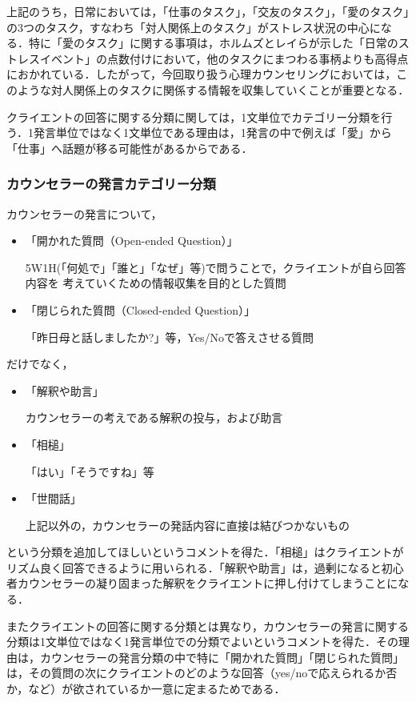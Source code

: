\documentclass[shuuron]{kuee}
\begin{document}
上記のうち，日常においては，「仕事のタスク」，「交友のタスク」，「愛のタスク」の3つのタスク，すなわち「対人関係上のタスク」がストレス状況の中心になる．特に「愛のタスク」に関する事項は，ホルムズとレイら\cite{holmes1967social}が示した「日常のストレスイベント」の点数付けにおいて，他のタスクにまつわる事柄よりも高得点におかれている．したがって，今回取り扱う心理カウンセリングにおいては，このような対人関係上のタスクに関係する情報を収集していくことが重要となる．

クライエントの回答に関する分類に関しては，1文単位でカテゴリー分類を行う．1発言単位ではなく1文単位である理由は，1発言の中で例えば「愛」から「仕事」へ話題が移る可能性があるからである．

\subsubsection{カウンセラーの発言カテゴリー分類}

カウンセラーの発言について，
\begin{itemize}
  \item 「開かれた質問（Open-ended Question）」

  5W1H(「何処で」「誰と」「なぜ」等)で問うことで，クライエントが自ら回答内容を
  考えていくための情報収集を目的とした質問
  \item 「閉じられた質問（Closed-ended Question）」

  「昨日母と話しましたか?」等，Yes/Noで答えさせる質問
\end{itemize}
だけでなく，
\begin{itemize}
  \item 「解釈や助言」

  カウンセラーの考えである解釈の投与，および助言
  \item 「相槌」

  「はい」「そうですね」等
  \item 「世間話」

  上記以外の，カウンセラーの発話内容に直接は結びつかないもの
\end{itemize}
という分類を追加してほしいというコメントを得た．「相槌」はクライエントがリズム良く回答できるように用いられる．「解釈や助言」は，過剰になると初心者カウンセラーの凝り固まった解釈をクライエントに押し付けてしまうことになる．

またクライエントの回答に関する分類とは異なり，カウンセラーの発言に関する分類は1文単位ではなく1発言単位での分類でよいというコメントを得た．その理由は，カウンセラーの発言分類の中で特に「開かれた質問」「閉じられた質問」は，その質問の次にクライエントのどのような回答（yes/noで応えられるか否か，など）が欲されているか一意に定まるためである．
\end{document}
